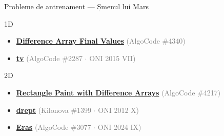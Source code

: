 ﻿\documentclass{beamer}
\begin{document}
\begin{frame}{Probleme de antrenament — Șmenul lui Mars}
  \begin{block}{1D}
    \begin{itemize}\footnotesize\itemsep0pt
      \item \href{https://code.algolymp.com/problems/4340}{\textbf{Difference Array Final Values}} \textcolor{gray}{(AlgoCode \#4340)}
      \item \href{https://code.algolymp.com/problems/2287}{\textbf{tv}} \textcolor{gray}{(AlgoCode \#2287 $\cdot$ ONI 2015 VII)}
    \end{itemize}
  \end{block}
  \vspace{-4pt}
  \begin{block}{2D}
    \begin{itemize}\footnotesize\itemsep0pt
      \item \href{https://code.algolymp.com/problems/4217}{\textbf{Rectangle Paint with Difference Arrays}} \textcolor{gray}{(AlgoCode \#4217)}
      \item \href{https://kilonova.ro/problems/1399}{\textbf{drept}} \textcolor{gray}{(Kilonova \#1399 $\cdot$ ONI 2012 X)}
      \item \href{https://code.algolymp.com/problems/3077}{\textbf{Eras}} \textcolor{gray}{(AlgoCode \#3077 $\cdot$ ONI 2024 IX)}
    \end{itemize}
  \end{block}
\end{frame}
\end{document}
